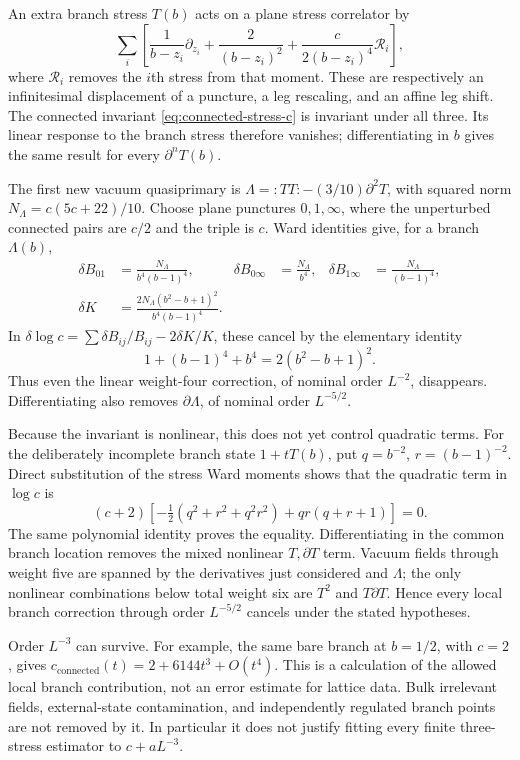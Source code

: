 An extra branch stress $T(b)$ acts on a plane stress correlator by
\[
 \sum_i\left[
 \frac1{b-z_i}\partial_{z_i}
 +\frac2{(b-z_i)^2}
 +\frac{c}{2(b-z_i)^4}\mathcal R_i\right],
\]
where $\mathcal R_i$ removes the $i$th stress from that moment.
These are respectively an infinitesimal displacement of a
puncture, a leg rescaling, and an affine leg shift. The connected
invariant \eqref{eq:connected-stress-c} is invariant under all
three. Its linear response to the branch stress therefore vanishes;
differentiating in $b$ gives the same result for every
$\partial^nT(b)$.

The first new vacuum quasiprimary is
$\Lambda=:TT:-(3/10)\partial^2T$, with squared norm
$N_\Lambda=c(5c+22)/10$. Choose plane punctures $0,1,\infty$,
where the unperturbed connected pairs are $c/2$ and the triple is
$c$. Ward identities give, for a branch $\Lambda(b)$,
\begin{align*}
 \delta B_{01}&=\frac{N_\Lambda}{b^4(b-1)^4},&
 \delta B_{0\infty}&=\frac{N_\Lambda}{b^4},&
 \delta B_{1\infty}&=\frac{N_\Lambda}{(b-1)^4},\\
 \delta K&=\frac{2N_\Lambda(b^2-b+1)^2}{b^4(b-1)^4}.
\end{align*}
In $\delta\log c=\sum\delta B_{ij}/B_{ij}-2\delta K/K$,
these cancel by the elementary identity
\[
 1+(b-1)^4+b^4=2(b^2-b+1)^2.
\]
Thus even the linear weight-four correction, of nominal order
$L^{-2}$, disappears. Differentiating also removes
$\partial\Lambda$, of nominal order $L^{-5/2}$.

Because the invariant is nonlinear, this does not yet control
quadratic terms. For the deliberately incomplete branch state
$1+tT(b)$, put $q=b^{-2}$, $r=(b-1)^{-2}$. Direct substitution
of the stress Ward moments shows that the quadratic term in
$\log c$ is
\[
 (c+2)\left[-\tfrac12(q^2+r^2+q^2r^2)+qr(q+r+1)\right]=0.
\]
The same polynomial identity proves the equality. Differentiating
in the common branch location removes the mixed nonlinear
$T,\partial T$ term. Vacuum fields through weight five are
spanned by the derivatives just considered and $\Lambda$;
the only nonlinear combinations below total weight six are
$T^2$ and $T\partial T$. Hence every local branch correction
through order $L^{-5/2}$ cancels under the stated hypotheses.

Order $L^{-3}$ can survive. For example, the same bare branch
at $b=1/2$, with $c=2$, gives
$c_{\mathrm{connected}}(t)=2+6144t^3+O(t^4)$.
This is a calculation of the allowed local branch contribution,
not an error estimate for lattice data. Bulk irrelevant fields,
external-state contamination, and independently regulated branch
points are not removed by it. In particular it does not justify
fitting every finite three-stress estimator to $c+aL^{-3}$.

